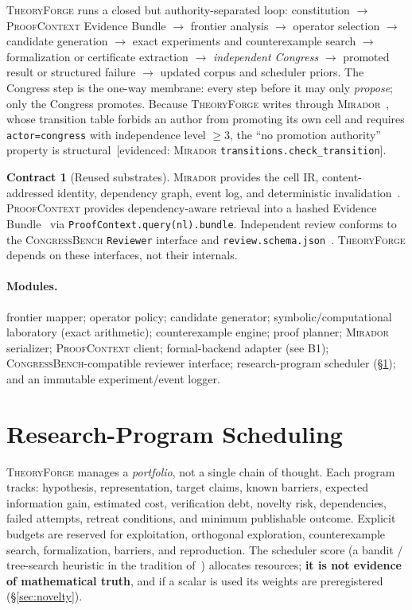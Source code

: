 \documentclass[11pt]{amsart}
\theoremstyle{definition}
\newtheorem{contract}{Contract}[section]
\theoremstyle{remark}
\newcommand{\mirador}{\textsc{Mirador}}
\newcommand{\pc}{\textsc{ProofContext}}
\newcommand{\cb}{\textsc{CongressBench}}
\newcommand{\tf}{\textsc{TheoryForge}}
\newcommand{\ev}[1]{\textsf{\footnotesize[#1]}} %
\begin{document}
\tf{} runs a closed but authority-separated loop: constitution $\to$ \pc{}
Evidence Bundle $\to$ frontier analysis $\to$ operator selection $\to$ candidate
generation $\to$ exact experiments and counterexample search $\to$ formalization
or certificate extraction $\to$ \emph{independent Congress} $\to$ promoted result
or structured failure $\to$ updated corpus and scheduler priors.
The Congress step is the one-way membrane: every step before it may only
\emph{propose};
only the Congress promotes. Because \tf{} writes through
\mirador{}~\cite{lucius2026mirador}, whose transition table forbids an author
from promoting its own cell and requires \texttt{actor=congress} with
independence level $\ge 3$, the ``no promotion authority'' property is
structural~\ev{evidenced: \mirador{} \texttt{transitions.check\_transition}}.

\begin{contract}[Reused substrates]\label{con:substrates}
\mirador{} provides the cell IR, content-addressed identity, dependency graph,
event log, and deterministic invalidation~\cite{lucius2026mirador}. \pc{}
provides dependency-aware retrieval into a hashed Evidence
Bundle~\cite{lucius2026proofcontext} via \texttt{ProofContext.query(nl).bundle}.
Independent review conforms to the \cb{} \texttt{Reviewer} interface and
\texttt{review.schema.json}~\cite{lucius2026congressbench}. \tf{} depends on
these interfaces, not their internals.
\end{contract}

\paragraph{Modules.} frontier mapper; operator policy; candidate generator;
symbolic/computational laboratory (exact arithmetic); counterexample engine;
proof planner; \mirador{} serializer; \pc{} client; formal-backend adapter (see
B1); \cb{}-compatible reviewer interface; research-program scheduler
(\S\ref{sec:scheduler}); and an immutable experiment/event logger.

\section{Research-Program Scheduling}\label{sec:scheduler}

\tf{} manages a \emph{portfolio}, not a single chain of thought. Each program
tracks: hypothesis, representation, target claims, known barriers, expected
information gain, estimated cost, verification debt, novelty risk, dependencies,
failed attempts, retreat conditions, and minimum publishable outcome. Explicit
budgets are reserved for exploitation, orthogonal exploration, counterexample
search, formalization, barriers, and reproduction. The scheduler score (a bandit
/ tree-search heuristic in the tradition of~\cite{Auer02, Browne12}) allocates
resources; \textbf{it is not evidence of mathematical truth}, and if a scalar is
used its weights are preregistered (\S\ref{sec:novelty}).
\end{document}
